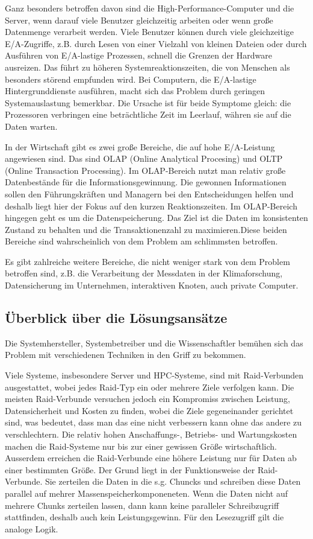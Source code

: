Ganz besonders betroffen davon sind die High-Performance-Computer und die Server, wenn darauf viele Benutzer gleichzeitig arbeiten oder wenn große Datenmenge verarbeit werden. Viele Benutzer können durch viele gleichzeitige E/A-Zugriffe, z.B. durch Lesen von einer Vielzahl von kleinen Dateien oder durch Ausführen von E/A-lastige Prozessen, schnell die Grenzen der Hardware ausreizen. Das führt zu höheren Systemreaktionszeiten, die von Menschen als besonders störend empfunden wird. Bei Computern, die E/A-lastige Hintergrunddienste ausführen, macht sich das Problem durch geringen Systemauslastung bemerkbar. Die Ursache ist für beide Symptome gleich: die Prozessoren verbringen eine beträchtliche Zeit im Leerlauf, währen sie auf die Daten warten. 

In der Wirtschaft gibt es zwei große Bereiche, die auf hohe E/A-Leistung angewiesen sind. Das sind OLAP (Online Analytical Procesing) und OLTP (Online Transaction Processing). Im OLAP-Bereich nutzt man relativ große Datenbestände für die Informationsgewinnung. Die gewonnen Informationen sollen den Führungskräften und Managern bei den Entscheidungen helfen und deshalb liegt hier der Fokus auf den kurzen Reaktionszeiten. Im OLAP-Bereich hingegen geht es um die Datenspeicherung. Das Ziel ist die Daten im konsistenten Zustand zu behalten und die Transaktionenzahl zu maximieren.Diese beiden Bereiche sind wahrscheinlich von dem Problem am schlimmsten betroffen.

Es gibt zahlreiche weitere Bereiche, die nicht weniger stark von dem Problem betroffen sind, z.B. die Verarbeitung der Messdaten in der Klimaforschung, Datensicherung im Unternehmen, interaktiven Knoten, auch private Computer.

\subsection{Überblick über die Lösungsansätze}
Die Systemhersteller, Systembetreiber und die Wissenschaftler bemühen sich das Problem mit verschiedenen Techniken in den Griff zu bekommen. 

Viele Systeme, insbesondere Server und HPC-Systeme, sind mit Raid-Verbunden ausgestattet, wobei jedes Raid-Typ ein oder mehrere Ziele verfolgen kann. Die meisten Raid-Verbunde versuchen jedoch ein Kompromiss zwischen Leistung, Datensicherheit und Kosten zu finden, wobei die Ziele gegeneinander gerichtet sind, was bedeutet, dass man das eine nicht verbessern kann ohne das andere zu verschlechtern. Die relativ hohen Anschaffungs-, Betriebs- und Wartungskosten machen die Raid-Systeme nur bis zur einer gewissen Größe wirtschaftlich. Ausserdem erreichen die Raid-Verbunde eine höhere Leistung nur für Daten ab einer bestimmten Größe. Der Grund liegt in der Funktionsweise der Raid-Verbunde. Sie zerteilen die Daten in die s.g. Chuncks und schreiben diese Daten parallel auf mehrer Massenspeicherkomponeneten. Wenn die Daten nicht auf mehrere Chunks zerteilen lassen, dann kann keine paralleler Schreibzugriff stattfinden, deshalb auch kein Leistungsgewinn. Für den Lesezugriff gilt die analoge Logik.

